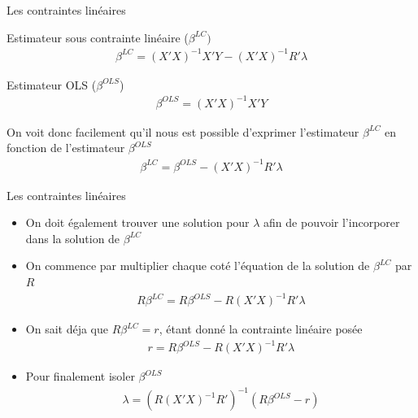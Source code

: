 \documentclass{beamer}
\begin{document}
\begin{frame}{Les contraintes linéaires}
\begin{block}{Estimateur sous contrainte linéaire ($\beta^{LC})$}
\begin{align*}
\beta^{LC}  = (X'X)^{-1}X'Y-(X'X)^{-1}R' \lambda
\end{align*}
\end{block}
\begin{block}{Estimateur OLS ($\beta^{OLS}$)}
\begin{align*}
\beta^{OLS}  = (X'X)^{-1}X'Y
\end{align*}
\end{block}
On voit donc facilement qu'il nous est possible d'exprimer l'estimateur $\beta^{LC}$ en fonction de l'estimateur $\beta^{OLS}$
\begin{align*}
\beta^{LC}  = \beta^{OLS}-(X'X)^{-1}R' \lambda
\end{align*}
\end{frame}

\begin{frame}{Les contraintes linéaires}
\begin{itemize}
\item On doit également trouver une solution pour $\lambda$ afin de pouvoir l'incorporer dans la solution de $\beta^{LC}$
\item On commence par multiplier chaque coté l'équation de la solution de $\beta^{LC}$ par $R$
\begin{align*}
R\beta^{LC}  = R\beta^{OLS}-R(X'X)^{-1}R' \lambda
\end{align*}
\item On sait déja que $R\beta^{LC}=r$, étant donné la contrainte linéaire posée
\begin{align*}
r  = R\beta^{OLS}-R(X'X)^{-1}R' \lambda
\end{align*}
\item Pour finalement isoler $\beta^{OLS}$
\begin{align*}
\lambda=(R(X'X)^{-1}R')^{-1}(R\beta^{OLS}-r)
\end{align*}
\end{itemize}
\end{frame}
\end{document}
